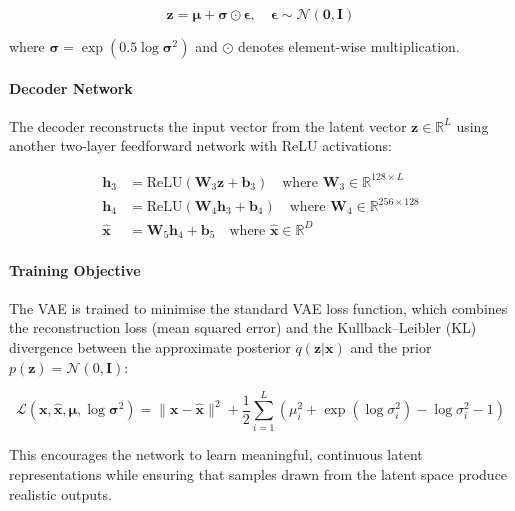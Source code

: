 \documentclass{article}
\begin{document}
\begin{equation}
\mathbf{z} = \boldsymbol{\mu} + \boldsymbol{\sigma} \odot \boldsymbol{\epsilon}, \quad \boldsymbol{\epsilon} \sim \mathcal{N}(\mathbf{0}, \mathbf{I})
\end{equation}

where $\boldsymbol{\sigma} = \exp(0.5 \log \boldsymbol{\sigma}^2)$ and $\odot$ denotes element-wise multiplication.

\paragraph{Decoder Network}

The decoder reconstructs the input vector from the latent vector $\mathbf{z} \in \mathbb{R}^L$ using another two-layer feedforward network with ReLU activations:

\begin{align}
\mathbf{h}_3 &= \text{ReLU}(\mathbf{W}_3 \mathbf{z} + \mathbf{b}_3) \quad \text{where } \mathbf{W}_3 \in \mathbb{R}^{128 \times L} \\
\mathbf{h}_4 &= \text{ReLU}(\mathbf{W}_4 \mathbf{h}_3 + \mathbf{b}_4) \quad \text{where } \mathbf{W}_4 \in \mathbb{R}^{256 \times 128} \\
\hat{\mathbf{x}} &= \mathbf{W}_5 \mathbf{h}_4 + \mathbf{b}_5 \quad \text{where } \hat{\mathbf{x}} \in \mathbb{R}^D
\end{align}

\paragraph{Training Objective}\label{prior_dist}

The VAE is trained to minimise the standard VAE loss function, which combines the reconstruction loss (mean squared error) and the Kullback--Leibler (KL) divergence between the approximate posterior $q(\mathbf{z}|\mathbf{x})$ and the prior $p(\mathbf{z}) = \mathcal{N}(0, \mathbf{I})$:

\begin{equation}\label{eq:VAE_loss_function}
\mathcal{L}(\mathbf{x}, \hat{\mathbf{x}}, \boldsymbol{\mu}, \log \boldsymbol{\sigma}^2) = \| \mathbf{x} - \hat{\mathbf{x}} \|^2 + \frac{1}{2} \sum_{i=1}^{L} \left( \mu_i^2 + \exp(\log \sigma_i^2) - \log \sigma_i^2 - 1 \right)
\end{equation}

This encourages the network to learn meaningful, continuous latent representations while ensuring that samples drawn from the latent space produce realistic outputs.
\end{document}
